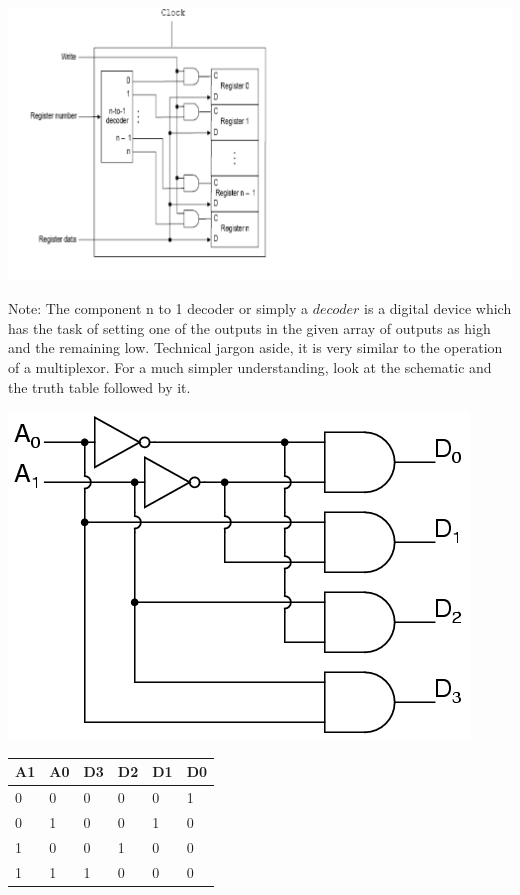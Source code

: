 \documentclass[11pt]{article}
\begin{document}
\begin{description}
\includegraphics[scale=0.7]{write.png}

Note: The component n to 1 decoder or simply a $decoder$ is a digital device which has the task of setting one of the outputs in the given array of outputs as high and the remaining low. Technical jargon aside, it is very similar to the operation of a multiplexor.  For a much simpler understanding, look at the schematic and the truth table followed by it.

\includegraphics[scale=0.7]{dec.png}

\begin{center}
	\begin{tabular}{ | l | l | l | l | l | l |}
	\hline
	A1&A0&D3&D2&D1&D0 \\ \hline
	0&0&0&0&0&1 \\ \hline
	0&1&0&0&1&0 \\ \hline
	1&0&0&1&0&0 \\ \hline
	1&1&1&0&0&0 \\ \hline
	\hline
	\end{tabular}
\end{center}


\end{description}
\end{document}
